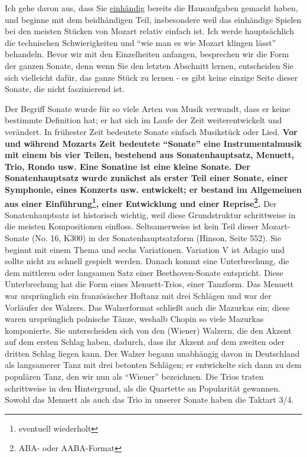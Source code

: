 Ich gehe davon aus, dass Sie \hyperref[c1ii7]{einhändig} bereits die Hausaufgaben gemacht haben, und beginne mit dem beidhändigen Teil, insbesondere weil das einhändige Spielen bei den meisten Stücken von Mozart relativ einfach ist.
Ich werde hauptsächlich die technischen Schwierigkeiten und \enquote{wie man es wie Mozart klingen lässt} behandeln.
Bevor wir mit den Einzelheiten anfangen, besprechen wir die Form der ganzen Sonate, denn wenn Sie den letzten Abschnitt lernen, entscheiden Sie sich vielleicht dafür, das ganze Stück zu lernen - es gibt keine einzige Seite dieser Sonate, die nicht faszinierend ist.

Der Begriff Sonate wurde für so viele Arten von Musik verwandt, dass er keine bestimmte Definition hat; er hat sich im Laufe der Zeit weiterentwickelt und verändert.
In frühester Zeit bedeutete Sonate einfach Musikstück oder Lied.
\textbf{Vor und während Mozarts Zeit bedeutete \enquote{Sonate} eine Instrumentalmusik mit einem bis vier Teilen, bestehend aus Sonatenhauptsatz, Menuett, Trio, Rondo usw.
Eine Sonatine ist eine kleine Sonate.
Der Sonatenhauptsatz wurde zunächst als erster Teil einer Sonate, einer Symphonie, eines Konzerts usw. entwickelt; er bestand im Allgemeinen aus einer Einführung\footnote{eventuell wiederholt}, einer Entwicklung und einer Reprise\footnote{ABA- oder AABA-Format}.}
Der Sonatenhauptsatz ist historisch wichtig, weil diese Grundstruktur schrittweise in die meisten Kompositionen einfloss. 
Seltsamerweise ist kein Teil dieser Mozart-Sonate (No. 16, K300) in der Sonatenhauptsatzform (Hinson, Seite 552).
Sie beginnt mit einem Thema und sechs Variationen.
Variation V ist Adagio und sollte nicht zu schnell gespielt werden.
Danach kommt eine Unterbrechung, die dem mittleren oder langsamen Satz einer Beethoven-Sonate entspricht.
Diese Unterbrechung hat die Form eines Menuett-Trios, einer Tanzform.
Das Menuett war ursprünglich ein französischer Hoftanz mit drei Schlägen und war der Vorläufer des Walzers.
Das Walzerformat schließt auch die Mazurkas ein; diese waren ursprünglich polnische Tänze, weshalb Chopin so viele Mazurkas komponierte.
Sie unterscheiden sich von den (Wiener) Walzern, die den Akzent auf dem ersten Schlag haben, dadurch, dass ihr Akzent auf dem zweiten oder dritten Schlag liegen kann.
Der Walzer begann unabhängig davon in Deutschland als langsamerer Tanz mit drei betonten Schlägen; er entwickelte sich dann zu dem populären Tanz, den wir nun als \enquote{Wiener} bezeichnen.
Die Trios traten schrittweise in den Hintergrund, als die Quartette an Popularität gewannen.
Sowohl das Menuett als auch das Trio in unserer Sonate haben die Taktart 3/4.
